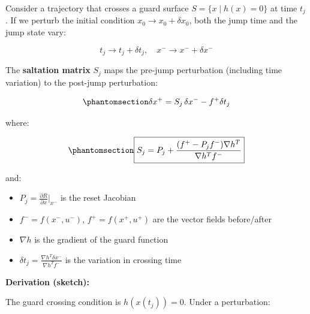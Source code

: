 \documentclass[
  letterpaper,
  DIV=11,
  numbers=noendperiod]{scrartcl}
\providecommand{\tightlist}{%
  \setlength{\itemsep}{0pt}\setlength{\parskip}{0pt}}\usepackage{longtable,booktabs,array}
\begin{document}
\begin{tcolorbox}[enhanced jigsaw, coltitle=black, titlerule=0mm, toprule=.15mm, opacitybacktitle=0.6, left=2mm, opacityback=0, rightrule=.15mm, leftrule=.75mm, breakable, colframe=quarto-callout-important-color-frame, bottomtitle=1mm, toptitle=1mm, arc=.35mm, title=\textcolor{quarto-callout-important-color}{\faExclamation}\hspace{0.5em}{Saltation Matrix}, bottomrule=.15mm, colback=white, colbacktitle=quarto-callout-important-color!10!white]

Consider a trajectory that crosses a guard surface
\(S = \{x \mid h(x) = 0\}\) at time \(t_j\). If we perturb the initial
condition \(x_0 \to x_0 + \delta x_0\), both the jump time and the jump
state vary:

\[
t_j \to t_j + \delta t_j, \quad x^- \to x^- + \delta x^-
\]

The \textbf{saltation matrix} \(S_j\) maps the pre-jump perturbation
(including time variation) to the post-jump perturbation:

\begin{equation}\phantomsection\label{eq-saltation-general}{
\delta x^+ = S_j \, \delta x^- - f^+ \delta t_j
}\end{equation}

where:

\begin{equation}\phantomsection\label{eq-saltation-matrix}{
\boxed{S_j = P_j + \frac{(f^+ - P_j f^-) \nabla h^T}{\nabla h^T f^-}}
}\end{equation}

and:

\begin{itemize}
\tightlist
\item
  \(P_j = \frac{\partial R}{\partial x}\big|_{x^-}\) is the reset
  Jacobian
\item
  \(f^- = f(x^-, u^-)\), \(f^+ = f(x^+, u^+)\) are the vector fields
  before/after
\item
  \(\nabla h\) is the gradient of the guard function
\item
  \(\delta t_j = \frac{\nabla h^T \delta x^-}{\nabla h^T f^-}\) is the
  variation in crossing time
\end{itemize}

\end{tcolorbox}

\textbf{Derivation (sketch):}

The guard crossing condition is \(h(x(t_j)) = 0\). Under a perturbation:
\end{document}

